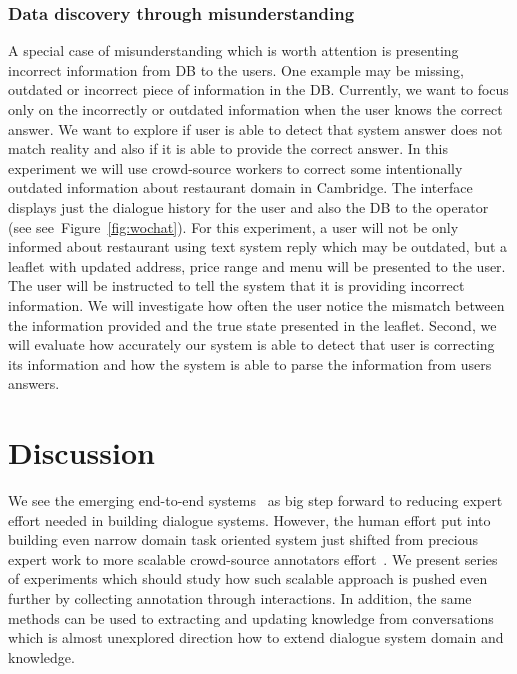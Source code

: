 \documentclass[11pt]{article}
\begin{document}
\subsubsection*{Data discovery through misunderstanding}
A special case of misunderstanding which is worth attention is presenting incorrect information from DB to the users.
One example may be missing, outdated or incorrect piece of information in the DB.
Currently, we want to focus only on the incorrectly or outdated information when the user knows the correct answer.
We want to explore if user is able to detect that system answer does not match reality and also if it is able to provide the correct answer.
In this experiment we will use crowd-source workers to correct some intentionally outdated information about restaurant domain in Cambridge.
The interface displays just the dialogue history for the user and also the DB to the operator (see see~Figure~\ref{fig:wochat}).
For this experiment, a user will not be only informed about restaurant using text system reply which may be outdated, but a leaflet with updated address, price range and menu will be presented to the user.
The user will be instructed to tell the system that it is providing incorrect information.
We will investigate how often the user notice the mismatch between the information provided and the true state presented in the leaflet.
Second, we will evaluate how accurately our system is able to detect that user is correcting its information and how the system is able to parse the information from users answers.



\section{Discussion}
\label{sec:discussion}

We see the emerging end-to-end systems~\cite{williams2016end,weston2015endtoend_prereq,wen_networkbased_2016} as big step forward to reducing expert effort needed in building dialogue systems.
However, the human effort put into building even narrow domain task oriented system just shifted from precious expert work to more scalable crowd-source annotators effort~\cite{wen_networkbased_2016,serban_building_2015}.
We present series of experiments which should study how such scalable approach is pushed even further by collecting annotation through interactions.
In addition, the same methods can be used to extracting and updating knowledge from conversations which is almost unexplored direction how to extend dialogue system domain and knowledge.
\end{document}
